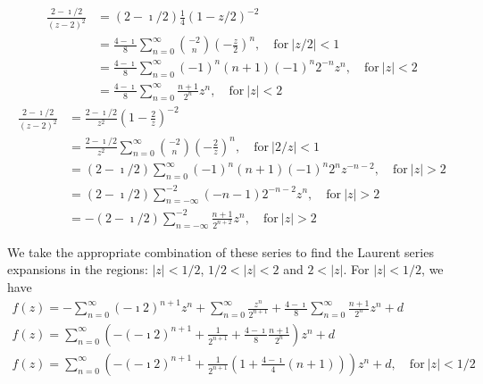 {\begin{Solution}
  \begin{align*}
    \frac{ 2 - \imath/2 }{(z - 2)^2}
    &= (2 - \imath / 2) \frac{1}{4} (1 - z / 2)^{-2} 
    \\
    &= \frac{4 - \imath}{8} \sum_{n = 0}^\infty \binom{-2}{n} \left( - \frac{z}{2} \right)^n,
    \quad \mathrm{for}\ |z/2| < 1 
    \\
    &= \frac{4 - \imath}{8} \sum_{n = 0}^\infty (-1)^n (n+1) (-1)^n 2^{-n} z^n, 
    \quad \mathrm{for}\ |z| < 2 
    \\
    &= \frac{4 - \imath}{8} \sum_{n = 0}^\infty \frac{n + 1}{2^n} z^n, 
    \quad \mathrm{for}\ |z| < 2 
  \end{align*}
  \begin{align*}
    \frac{ 2 - \imath / 2 }{(z - 2)^2}
    &= \frac{ 2 - \imath / 2 }{ z^2 } \left( 1 - \frac{2}{z} \right)^{-2} 
    \\
    &= \frac{ 2 - \imath / 2 }{ z^2 } \sum_{n = 0}^\infty \binom{-2}{n} 
    \left( - \frac{2}{z} \right)^n,
    \quad \mathrm{for}\ |2 / z| < 1 
    \\
    &= ( 2 - \imath / 2 ) \sum_{n = 0}^\infty (-1)^n (n+1) (-1)^n 2^n z^{-n-2},
    \quad \mathrm{for}\ |z| > 2 
    \\
    &= ( 2 - \imath / 2 ) \sum_{n = -\infty}^{-2} (- n - 1) 2^{-n-2} z^n,
    \quad \mathrm{for}\ |z| > 2 
    \\
    &= - ( 2 - \imath / 2 ) \sum_{n = -\infty}^{-2} \frac{n + 1}{2^{n+2}} z^n,
    \quad \mathrm{for}\ |z| > 2 
  \end{align*}

  We take the appropriate combination of these series to find the 
  Laurent series
  expansions in the regions: $|z| < 1/2$, $1/2 < |z| < 2$ and $2 < |z|$.
  For $|z| < 1/2$, we have
  \begin{gather*}
    f(z) = - \sum_{n = 0}^\infty (- \imath 2)^{n+1} z^n + \sum_{n = 0}^\infty \frac{z^n}{2^{n+1}}
    + \frac{4 - \imath}{8} \sum_{n = 0}^\infty \frac{n + 1}{2^n} z^n
    + d 
    \\
    f(z) = \sum_{n = 0}^\infty \left( - (- \imath 2)^{n+1}
      + \frac{1}{2^{n+1}}
      + \frac{4 - \imath}{8} \frac{n + 1}{2^n} \right) z^n
    + d 
    \\
    \boxed{
      f(z) = \sum_{n = 0}^\infty \left( - (- \imath 2)^{n+1}
        + \frac{1}{2^{n+1}} \left( 1 
          + \frac{4 - \imath}{4} (n + 1) \right) \right) z^n
      + d, \quad \mathrm{for}\ |z| < 1/2
      }
  \end{gather*}


\end{Solution}}
